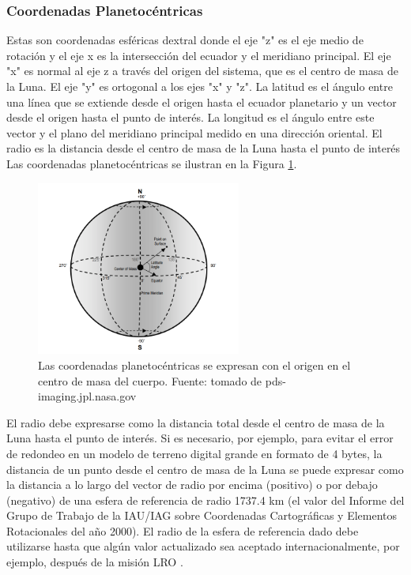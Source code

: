 \documentclass[12pt]{article}
\begin{document}
\subsubsection{Coordenadas Planetocéntricas}
Estas son coordenadas esféricas 
dextral donde el eje "z" es el eje medio de rotación y el eje x es la intersección del ecuador y el 
meridiano principal. El eje "x" es normal al eje z a través del origen del sistema, que es el 
centro de masa de la Luna. El eje "y" es ortogonal a los ejes "x" y "z". La latitud es el ángulo entre una 
línea que se extiende desde el origen hasta el ecuador planetario y un vector desde el origen hasta el punto de 
interés. La longitud es el ángulo entre este vector y el plano del meridiano principal medido en 
una dirección oriental. El radio es la distancia desde el centro de masa de la Luna hasta el punto de interés \parencite{lro_coordinate_system} 
Las coordenadas planetocéntricas se ilustran en la Figura \ref{fig:coordenadas_luna}.
\begin{figure}[H]
    \centering
    \includegraphics[width=0.6\textwidth]{images/coord_planetocentricas.png}
    \caption{Las coordenadas planetocéntricas se expresan con el origen en el centro de masa del cuerpo. Fuente: tomado de pds-imaging.jpl.nasa.gov}
    \label{fig:coordenadas_luna}
\end{figure}

El radio debe expresarse como la distancia total desde el centro de masa de la Luna hasta 
el punto de interés. Si es necesario, por ejemplo, para evitar el error de redondeo en un modelo de terreno digital 
grande en formato de 4 bytes, la distancia de un punto desde el centro de masa de la Luna se puede expresar como la 
distancia a lo largo del vector de radio por encima (positivo) o por debajo (negativo) de una esfera de referencia de radio 
1737.4 km (el valor del Informe del Grupo de Trabajo de la IAU/IAG sobre Coordenadas Cartográficas y Elementos Rotacionales 
del año 2000). El radio de la esfera de referencia dado debe utilizarse hasta que algún valor actualizado sea 
aceptado internacionalmente, por ejemplo, después de la misión LRO \parencite{lro_coordinate_system}.
\end{document}
